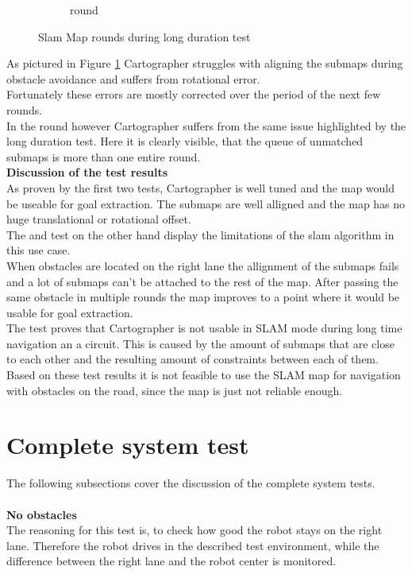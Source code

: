 \begin{figure}[H]
\begin{subfigure}{.3\linewidth}
		\caption{ round}
	\end{subfigure}

	\caption{Slam Map rounds during long duration test}
	\label{4slamtest}

\end{figure}

As pictured in Figure \ref{4slamtest} Cartographer struggles with aligning the submaps during obstacle avoidance and suffers from rotational error.\\
Fortunately these errors are mostly corrected over the period of the next few rounds.\\ In the  round however Cartographer suffers from the same issue highlighted by the long duration test. Here it is clearly visible, that the queue of unmatched submaps is more than one entire round.\\

\textbf{Discussion of the test results}\\
As proven by the first two tests, Cartographer is well tuned and the map would be useable for goal extraction. The submaps are well alligned and the map has no huge translational or rotational offset.\\

The  and  test on the other hand display the limitations of the slam algorithm in this use case.\\
When obstacles are located on the right lane the allignment of the submaps fails and a lot of submaps can't be attached to the rest of the map. After passing the same obstacle in multiple rounds the map improves to a point where it would be usable for goal extraction.\\
The  test proves that Cartographer is not usable in SLAM mode during long time navigation an a circuit. This is caused by the amount of submaps that are close to each other and the resulting amount of constraints between each of them.\\

Based on these test results it is not feasible to use the SLAM map for navigation with obstacles on the road, since the map is just not reliable enough.




\section{Complete system test}
The following subsections cover the discussion of the complete system tests.\\\\
\textbf{No obstacles}\\
The reasoning for this test is, to check how good the robot stays on the right lane. Therefore the robot drives in the described test environment, while the difference between the right lane and the robot center is monitored.

